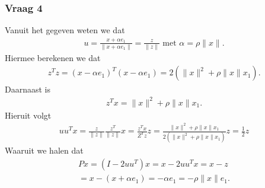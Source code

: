 \documentclass{article}
\begin{document}
\subsubsection*{Vraag 4}

Vanuit het gegeven weten we dat 
\begin{align*}
    u=\frac{x+\alpha e_1}{\parallel x+\alpha e_1\parallel} = \frac{z}{\parallel z \parallel} \text{ met } \alpha = \rho \parallel x \parallel.
\end{align*}
Hiermee berekenen we dat
\begin{align*}
    z^Tz = (x-\alpha e_1)^T(x-\alpha e_1) = 2(\parallel x \parallel^2+\rho \parallel x \parallel x_1).
\end{align*} 
Daarnaast is 
\begin{align*}
    z^Tx=\parallel x \parallel^2+\rho \parallel x \parallel x_1.
\end{align*} 
Hieruit volgt
\begin{align*}
    uu^Tx=\frac{z}{\parallel z \parallel} \frac{z^T}{\parallel z \parallel}x=\frac{z^Tx}{Z^Tz}z=\frac{\parallel x \parallel^2+\rho \parallel x \parallel x_1}{2(\parallel x \parallel^2+\rho \parallel x \parallel x_1)}z=\frac{1}{2}z
\end{align*}
Waaruit we halen dat
\begin{align*}
    Px=(I-2uu^T)x=x-2uu^Tx=x-z\\
    =x-(x+\alpha e_1)=-\alpha e_1 = -\rho \parallel x \parallel e_1.
\end{align*}
\end{document}
